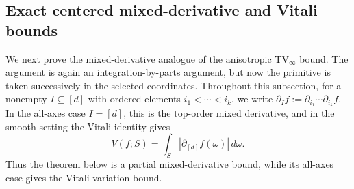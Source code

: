 \documentclass[11pt,letterpaper]{article}
\theoremstyle{definition}
\theoremstyle{remark}
\newtheorem{remark}[theorem]{Remark}
\newcommand{\TV}{\mathrm{TV}}
\begin{document}

\subsection{Exact centered mixed-derivative and Vitali bounds } 
\label{subsec:exact_centered_mixed_derivative_vitali_bounds}

We next prove the mixed-derivative analogue of the anisotropic $\TV_\infty$
bound. The argument is again an integration-by-parts argument, but now the
primitive is taken successively in the selected coordinates. Throughout this
subsection, for a nonempty $I\subseteq[d]$ with ordered elements
$i_1<\cdots<i_k$, we write $\partial_I f:=\partial_{i_1}\cdots\partial_{i_k}f$.
In the all-axes case $I=[d]$, this is the top-order mixed derivative, and in
the smooth setting the Vitali identity gives
$$
V(f;S)=\int_S |\partial_{[d]} f(\omega)|\,d\omega .
$$
Thus the theorem below is a partial mixed-derivative bound, while its all-axes
case gives the Vitali-variation bound. 
\end{document}
